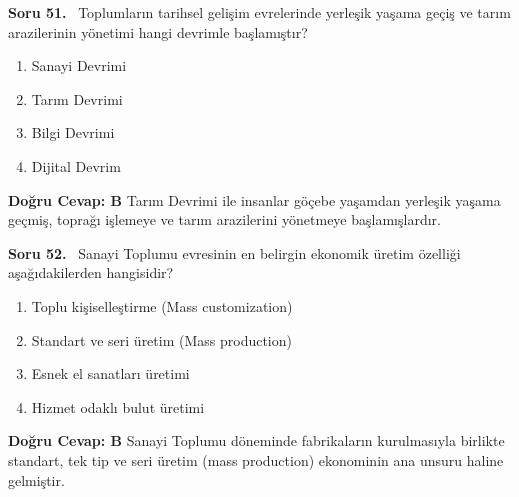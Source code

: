 \documentclass[11pt,a4paper,openany]{book}
\begin{document}
\needspace{5cm}
\vspace{8pt}
\noindent\textbf{\large\sffamily Soru 51.} \ Toplumların tarihsel gelişim evrelerinde yerleşik yaşama geçiş ve tarım arazilerinin yönetimi hangi devrimle başlamıştır?
\begin{enumerate}[label=\Alph*), leftmargin=25pt, topsep=4pt, itemsep=2pt]
    \item Sanayi Devrimi
    \item Tarım Devrimi
    \item Bilgi Devrimi
    \item Dijital Devrim
\end{enumerate}
\vspace{4pt}
\begin{tcolorbox}[title=Cevap ve Açıklama, colback=gray!3!white, colframe=primarycolor!90!black, arc=2mm, fonttitle=\bfseries\sffamily, top=6pt, bottom=6pt]
    \textbf{Doğru Cevap: B}
    \vspace{2pt}
    Tarım Devrimi ile insanlar göçebe yaşamdan yerleşik yaşama geçmiş, toprağı işlemeye ve tarım arazilerini yönetmeye başlamışlardır.
\end{tcolorbox}
\vspace{10pt}

\needspace{5cm}
\vspace{8pt}
\noindent\textbf{\large\sffamily Soru 52.} \ Sanayi Toplumu evresinin en belirgin ekonomik üretim özelliği aşağıdakilerden hangisidir?
\begin{enumerate}[label=\Alph*), leftmargin=25pt, topsep=4pt, itemsep=2pt]
    \item Toplu kişiselleştirme (Mass customization)
    \item Standart ve seri üretim (Mass production)
    \item Esnek el sanatları üretimi
    \item Hizmet odaklı bulut üretimi
\end{enumerate}
\vspace{4pt}
\begin{tcolorbox}[title=Cevap ve Açıklama, colback=gray!3!white, colframe=primarycolor!90!black, arc=2mm, fonttitle=\bfseries\sffamily, top=6pt, bottom=6pt]
    \textbf{Doğru Cevap: B}
    \vspace{2pt}
    Sanayi Toplumu döneminde fabrikaların kurulmasıyla birlikte standart, tek tip ve seri üretim (mass production) ekonominin ana unsuru haline gelmiştir.
\end{tcolorbox}
\vspace{10pt}
\end{document}
